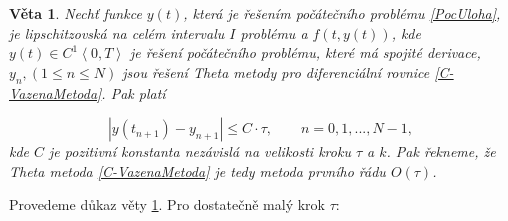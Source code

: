 \documentclass[a4paper,12pt,twoside]{article}
\newtheorem{veta}{Věta}[section]
\theoremstyle{definition}
\theoremstyle{remark}
\numberwithin{equation}{section}
\numberwithin{table}{section}
\numberwithin{figure}{section}
\begin{document}
\begin{veta} \label{RadEulerovyMetody}
	Nechť funkce $y\left(t\right)$, která je řešením počátečního problému \eqref{PocUloha}, je lipschitzovská na celém intervalu $I$ problému a $f \left(t,y \left(t\right)\right)$, kde $y\left(t\right) \in C^{1}\left\langle 0, T\right\rangle$ je řešení počátečního problému, které má spojité derivace,
	$y_{n}, \left(1 \leq n \leq N\right)$ jsou řešení Theta metody pro diferenciální rovnice \eqref{C-VazenaMetoda}. Pak platí
	
	\begin{equation}
		|y\left(t_{n+1}\right) - y_{n+1}| \leq C\cdot \tau, \qquad n = 0,1, ..., N-1,
	\end{equation} 
	kde $C$ je pozitivní konstanta nezávislá na velikosti kroku $\tau$  a $k$. Pak řekneme, že Theta metoda \eqref{C-VazenaMetoda} je tedy metoda prvního řádu $O\left(\tau\right)$. \cite{Cangpin}
\end{veta}
Provedeme důkaz věty \ref{RadEulerovyMetody}. Pro dostatečně malý krok $\tau$:
\end{document}
